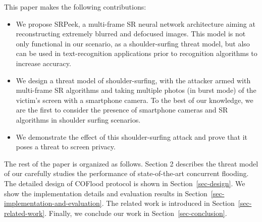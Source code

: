 This paper makes the following contributions:
\begin{itemize}
  \item	We propose \textsf{SRPeek}, a multi-frame SR neural network architecture aiming at reconstructing extremely blurred and defocused images. This model is not only functional in our scenario, as a shoulder-surfing threat model, but also can be used in text-recognition applications prior to recognition algorithms to increase accuracy.
  \item	We design a threat model of shoulder-surfing, with the attacker armed with multi-frame SR algorithms and taking multiple photos (in burst mode) of the victim’s screen with a smartphone camera. To the best of our knowledge, we are the first to consider the presence of smartphone cameras and SR algorithms in shoulder surfing scenarios.
  \item	We demonstrate the effect of this shoulder-surfing attack and prove that it poses a threat to screen privacy.
\end{itemize}

The rest of the paper is organized as follows. Section 2 describes the threat model of our  carefully studies the performance of state-of-the-art concurrent flooding. The detailed design of COFlood protocol is shown in Section~\ref{sec-design}. We show the implementation details and evaluation results in Section~\ref{sec-implementation-and-evaluation}. The related work is introduced in Section~\ref{sec-related-work}. Finally, we conclude our work in Section~\ref{sec-conclusion}.
